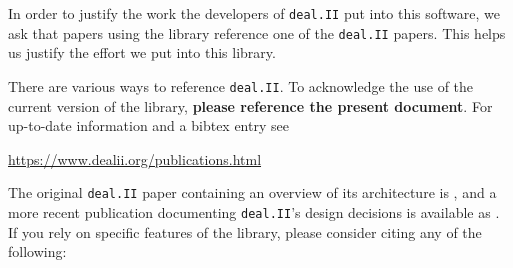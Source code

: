 \documentclass{ansarticle-preprint}
\newcommand{\specialword}[1]{\texttt{#1}}
\newcommand{\dealii}{{\specialword{deal.II}}\xspace}
\begin{document}
In order to justify the work the developers of \dealii put into this
software, we ask that papers using the library reference one of the
\dealii papers. This helps us justify the effort we put into this library.

There are various ways to reference \dealii. To acknowledge the use of
the current version of the library, \textbf{please reference the present
  document}. For up-to-date information and a bibtex entry
see
\begin{center}
  \url{https://www.dealii.org/publications.html}
\end{center}

The original \dealii paper containing an overview of its
architecture is \cite{BangerthHartmannKanschat2007}, and a more recent
publication documenting \dealii's design decisions is available as \cite{dealII2020design}. If you rely on
specific features of the library, please consider citing any of the
following:
\end{document}
